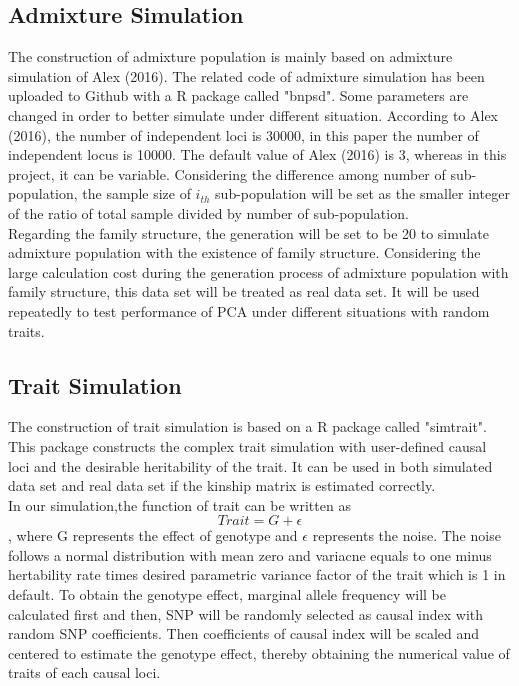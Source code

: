 \documentclass[12pt]{article}
\theoremstyle{definition}
\theoremstyle{plain}
\begin{document}
\subsection{Admixture Simulation}
The construction of admixture population is mainly based on admixture simulation of Alex (2016). The related code of admixture simulation has been uploaded to Github with a R package called "bnpsd".  Some parameters are changed in order to better simulate under different situation. According to Alex (2016), the number of independent loci is 30000, in this paper the number of independent locus is 10000. The default value of Alex (2016) is 3, whereas in this project, it can be variable. Considering the difference among number of sub-population, the sample size of $i_{th}$ sub-population will be set as the smaller integer of the ratio of total sample divided by number of sub-population.\\
Regarding the family structure, the generation will be set to be 20 to simulate admixture population with the existence of family structure. Considering the large calculation cost during the generation process of admixture population with family structure, this data set will be treated as real data set. It will be used repeatedly to test performance of PCA under different situations with random traits.



\subsection{Trait Simulation}
The construction of trait simulation is based on a R package called "simtrait". This package constructs the complex trait simulation with user-defined causal loci and the desirable heritability of the trait. It can be used in both simulated data set and real data set if the kinship matrix is estimated correctly. \\
In our simulation,the function of trait can be written as $$Trait=G+ \epsilon$$ 
, where G represents the effect of genotype and $\epsilon$ represents the noise.  The noise follows a normal distribution with mean zero and variacne  equals to one minus hertability rate times desired parametric variance factor of the trait which is 1 in default. To obtain the genotype effect, marginal allele frequency will be calculated first and then, SNP will be randomly selected as causal index with random SNP coefficients. Then  coefficients of causal index will be scaled and centered to estimate the genotype effect, thereby obtaining the numerical value of traits of each causal loci.
\end{document}
